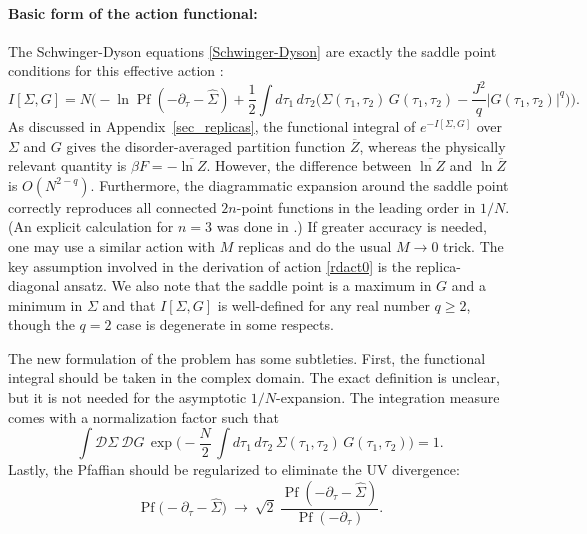 \documentclass[12pt]{article}
\renewcommand{\ge}{\geqslant}
\newcommand{\calD}{\mathcal{D}}
\DeclareMathOperator{\Pf}{Pf}
\begin{document}
\paragraph{Basic form of the action functional:}
The Schwinger-Dyson equations \eqref{Schwinger-Dyson} are exactly the saddle point conditions for this effective action \cite{Kit.KITP, Sach15}:
\begin{equation}\label{rdact0}
I[\Sigma,G]
=N\Biggl(-\ln\Pf(-\partial_\tau-\hat{\Sigma})
+\frac{1}{2}\int d\tau_1\,d\tau_2
\biggl(\Sigma(\tau_1,\tau_2)\,G(\tau_1,\tau_2)
-\frac{J^2}{q}\bigl|G(\tau_1,\tau_2)\bigr|^q\biggr)\!\Biggr).
\end{equation}
As discussed in Appendix~\ref{sec_replicas}, the functional integral of $e^{-I[\Sigma,G]}$ over $\Sigma$ and $G$ gives the disorder-averaged partition function $\overline{Z}$, whereas the physically relevant quantity is $\beta F=-\overline{\ln Z}$. However, the difference between $\overline{\ln Z}$ and $\ln\overline{Z}$ is $O(N^{2-q})$. Furthermore, the diagrammatic expansion around the saddle point correctly reproduces all connected $2n$-point functions in the leading order in $1/N$. (An explicit calculation for $n=3$ was done in \cite{GrRo17}.) If greater accuracy is needed, one may use a similar action with $M$ replicas and do the usual $M\to 0$ trick. The key assumption involved in the derivation of action \eqref{rdact0} is the replica-diagonal ansatz. We also note that the saddle point is a maximum in $G$ and a minimum in $\Sigma$ and that $I[\Sigma,G]$ is well-defined for any real number $q\ge 2$, though the $q=2$ case is degenerate in some respects.

The new formulation of the problem has some subtleties. First, the functional integral should be taken in the complex domain. The exact definition is unclear, but it is not needed for the asymptotic $1/N$-expansion. The integration measure comes with a normalization factor such that
\begin{equation}
\int\calD\Sigma\: \calD G\,\exp\biggl(
-\frac{N}{2}\,\int d\tau_1\,d\tau_2\,
\Sigma(\tau_1,\tau_2)\,G(\tau_1,\tau_2)\biggr) =1.
\end{equation}
Lastly, the Pfaffian should be regularized to eliminate the UV divergence:
\begin{equation}\label{regPf}
\Pf\bigl(-\partial_\tau-\hat{\Sigma}\bigr)\:\to\:
\sqrt{2}\:\frac{\Pf(-\partial_\tau-\hat{\Sigma})}{\Pf(-\partial_\tau)}.
\end{equation}
\end{document}
